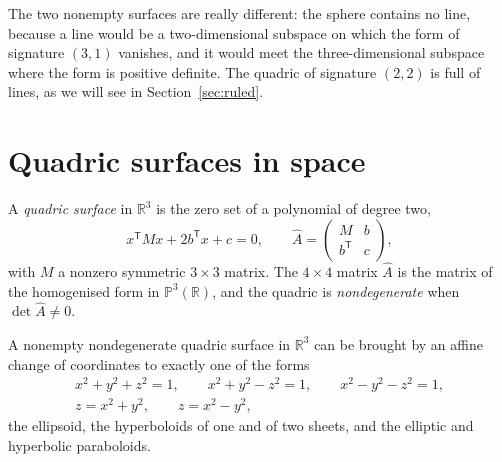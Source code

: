 The two nonempty surfaces are really different: the sphere contains no line, because a line would be a two-dimensional subspace on which the
form of signature $(3,1)$ vanishes, and it would meet the three-dimensional subspace where the form is positive definite. The quadric of
signature $(2,2)$ is full of lines, as we will see in Section~\ref{sec:ruled}.

\section{Quadric surfaces in space}

A \emph{quadric surface} in $\mathbb R^3$ is the zero set of a polynomial of degree two,
\[
x^{\mathsf T}Mx+2b^{\mathsf T}x+c=0,\qquad
\hat A=\begin{pmatrix}M&b\\b^{\mathsf T}&c\end{pmatrix},
\]
with $M$ a nonzero symmetric $3\times3$ matrix. The $4\times4$ matrix $\hat A$ is the matrix of the homogenised form in $\mathbb P^3(\mathbb R)$, and
the quadric is \emph{nondegenerate} when $\det\hat A\ne0$.

\begin{theorem}\label{thm:quadrics}
A nonempty nondegenerate quadric surface in $\mathbb R^3$ can be brought by an affine change of coordinates to exactly one of the forms
\[
\begin{gathered}
x^2+y^2+z^2=1,\qquad x^2+y^2-z^2=1,\qquad x^2-y^2-z^2=1,\\
z=x^2+y^2,\qquad z=x^2-y^2,
\end{gathered}
\]
the ellipsoid, the hyperboloids of one and of two sheets, and the elliptic and hyperbolic paraboloids.
\end{theorem}

